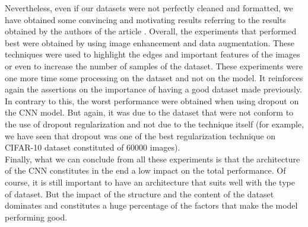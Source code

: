 \documentclass[11pt, openany]{report}
\theoremstyle{plain}
\theoremstyle{definition}
\theoremstyle{remark}
\begin{document}
Nevertheless, even if our datasets were not perfectly cleaned and formatted, we have obtained some convincing and motivating results referring to the results obtained by the authors of the article \cite{leukemia}. Overall, the experiments that performed best were obtained by using image enhancement and data augmentation. These techniques were used to highlight the edges and important features of the images or even to increase the number of samples of the dataset. These experiments were one more time some processing on the dataset and not on the model. It reinforces again the assertions on the importance of having a good dataset made previously. In contrary to this, the worst performance were obtained when using dropout on the CNN model. But again, it was due to the dataset that were not conform to the use of dropout regularization and not due to the technique itself (for example, we have seen that dropout was one of the best regularization technique on CIFAR-10 dataset constituted of 60000 images). \\ 

Finally, what we can conclude from all these experiments is that the architecture of the CNN constitutes in the end a low impact on the total performance. Of course, it is still important to have an architecture that suits well with the type of dataset. But the impact of the structure and the content of the dataset dominates and constitutes a huge percentage of the factors that make the model performing good.  



\nocite{*}

\end{document}
